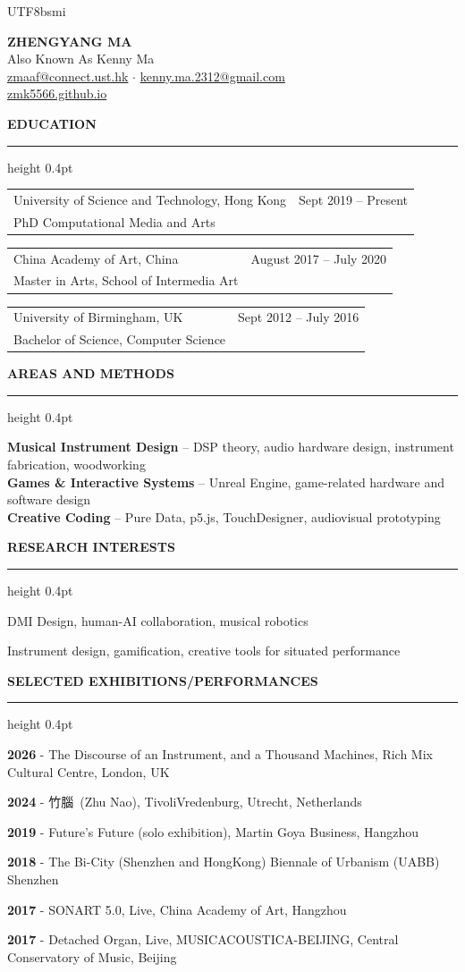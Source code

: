 \documentclass[10pt,letterpaper]{article}
\makeatletter
\newcommand{\cvsection}[1]{%
  \vspace{1.05em}%
  {\bfseries\MakeUppercase{#1}}\par
  \vspace{0.2em}%
  \hrule height 0.4pt
  \vspace{0.55em}%
}
\newcommand{\education}[4]{%
  \begin{tabular*}{\textwidth}{@{\hspace{1.1em}}l@{\extracolsep{\fill}}r@{}}
    #1 & #2 \\
    #3 &
  \end{tabular*}\par
  \vspace{0.75em}
}
\newcommand{\yearitem}[2]{%
  \hspace{1.1em}\parbox[t]{0.96\textwidth}{\raggedright #1 - #2}\par
}
\makeatother
\begin{document}
\begin{CJK*}{UTF8}{bsmi}

\begin{center}
  {\Large\bfseries ZHENGYANG MA}\\[0.75em]
  Also Known As Kenny Ma\\[0.25em]
  \href{mailto:zmaaf@connect.ust.hk}{zmaaf@connect.ust.hk}
  \quad$\cdot$\quad
  \href{mailto:kenny.ma.2312@gmail.com}{kenny.ma.2312@gmail.com}\\[0.25em]
  \href{https://zmk5566.github.io}{zmk5566.github.io}
\end{center}

\cvsection{Education}

\education
  {University of Science and Technology, Hong Kong}
  {Sept 2019 -- Present}
  {PhD Computational Media and Arts}
  {}

\education
  {China Academy of Art, China}
  {August 2017 -- July 2020}
  {Master in Arts, School of Intermedia Art}
  {}

\education
  {University of Birmingham, UK}
  {Sept 2012 -- July 2016}
  {Bachelor of Science, Computer Science}
  {}

\cvsection{Areas and Methods}

\hspace{1.1em}\parbox{0.96\textwidth}{\raggedright
\textbf{Musical Instrument Design} -- DSP theory, audio hardware design, instrument fabrication, woodworking\\[0.2em]
\textbf{Games \& Interactive Systems} -- Unreal Engine, game-related hardware and software design\\[0.2em]
\textbf{Creative Coding} -- Pure Data, p5.js, TouchDesigner, audiovisual prototyping
}

\cvsection{Research Interests}

\hspace{1.1em}DMI Design, human-AI collaboration, musical robotics\par
\vspace{0.35em}
\hspace{1.1em}Instrument design, gamification, creative tools for situated performance

\cvsection{Selected Exhibitions/Performances}

\yearitem{\textbf{2026}}{The Discourse of an Instrument, and a Thousand Machines, Rich Mix Cultural Centre, London, UK}
\yearitem{\textbf{2024}}{竹腦\ (Zhu Nao), TivoliVredenburg, Utrecht, Netherlands}
\yearitem{\textbf{2019}}{Future's Future (solo exhibition), Martin Goya Business, Hangzhou}
\yearitem{\textbf{2018}}{The Bi-City (Shenzhen and HongKong) Biennale of Urbanism (UABB) Shenzhen}
\yearitem{\textbf{2017}}{SONART 5.0, Live, China Academy of Art, Hangzhou}
\yearitem{\textbf{2017}}{Detached Organ, Live, MUSICACOUSTICA-BEIJING, Central Conservatory of Music, Beijing}


\end{CJK*}
\end{document}
